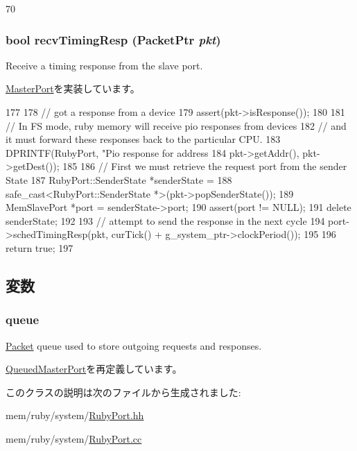 \begin{DoxyCode}
70 {}
\end{DoxyCode}
\hypertarget{classRubyPort_1_1MemMasterPort_a482dba5588f4bee43e498875a61e5e0b}{
\subsubsection[{recvTimingResp}]{\setlength{\rightskip}{0pt plus 5cm}bool recvTimingResp ({\bf PacketPtr} {\em pkt})}}
\label{classRubyPort_1_1MemMasterPort_a482dba5588f4bee43e498875a61e5e0b}
Receive a timing response from the slave port. 

\hyperlink{classMasterPort_abd323548d6c93f8b0543f1fe3a86ca35}{MasterPort}を実装しています。


\begin{DoxyCode}
177 {
178     // got a response from a device
179     assert(pkt->isResponse());
180 
181     // In FS mode, ruby memory will receive pio responses from devices
182     // and it must forward these responses back to the particular CPU.
183     DPRINTF(RubyPort,  "Pio response for address %
184             pkt->getAddr(), pkt->getDest());
185 
186     // First we must retrieve the request port from the sender State
187     RubyPort::SenderState *senderState =
188         safe_cast<RubyPort::SenderState *>(pkt->popSenderState());
189     MemSlavePort *port = senderState->port;
190     assert(port != NULL);
191     delete senderState;
192 
193     // attempt to send the response in the next cycle
194     port->schedTimingResp(pkt, curTick() + g_system_ptr->clockPeriod());
195 
196     return true;
197 }
\end{DoxyCode}


\subsection{変数}
\hypertarget{classRubyPort_1_1MemMasterPort_aae3ed0c3ef8ff189915e74fe401279b5}{
\subsubsection[{queue}]{ {\bf queue}}}
\label{classRubyPort_1_1MemMasterPort_aae3ed0c3ef8ff189915e74fe401279b5}
\hyperlink{classPacket}{Packet} queue used to store outgoing requests and responses. 

\hyperlink{classQueuedMasterPort_ae4e2ec83c21e5a331cecc31d84b2dbb7}{QueuedMasterPort}を再定義しています。

このクラスの説明は次のファイルから生成されました:\begin{DoxyCompactItemize}
\item 
mem/ruby/system/\hyperlink{RubyPort_8hh}{RubyPort.hh}\item 
mem/ruby/system/\hyperlink{RubyPort_8cc}{RubyPort.cc}\end{DoxyCompactItemize}
